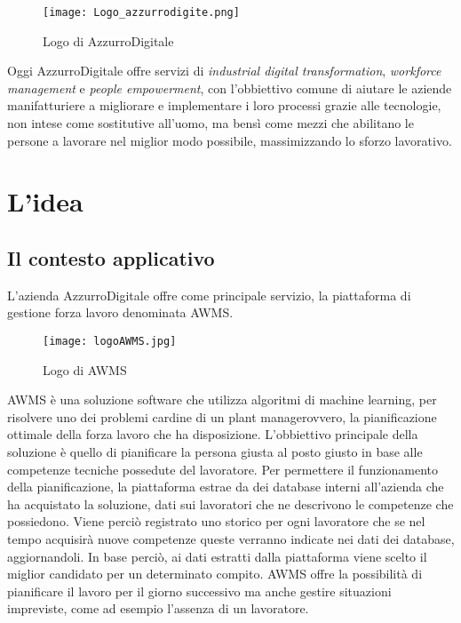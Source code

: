 \begin{figure}[h]
	\begin{center}
		\texttt{[image: Logo\_azzurrodigite.png]}
			\caption{Logo di AzzurroDigitale}
	\end{center}
\end{figure}
\pagebreak

Oggi AzzurroDigitale offre servizi di \emph{industrial digital transformation}, \emph{workforce management} e \emph{people empowerment}, con l'obbiettivo comune di aiutare le aziende manifatturiere a migliorare e implementare i loro processi grazie alle tecnologie, non intese come sostitutive all’uomo, ma bensì come mezzi che abilitano le persone a lavorare nel miglior modo possibile, massimizzando lo sforzo lavorativo.\\

\section{L'idea}

\subsection{Il contesto applicativo}
L'azienda AzzurroDigitale offre come principale servizio, la piattaforma di gestione forza lavoro denominata \gls{AWMS}.\\
	\begin{figure}[!h] 
		\begin{center}
			\texttt{[image: logoAWMS.jpg]}
			\caption{Logo di AWMS}
		\end{center}
	\end{figure}

\gls{AWMS} è una soluzione software che utilizza algoritmi di \gls{machine learning}\glsfirstoccur, per risolvere uno dei problemi cardine di un \gls{plant manager}\glsfirstoccur ovvero, la pianificazione ottimale della forza lavoro che ha disposizione. L'obbiettivo principale della soluzione è quello di pianificare la persona giusta al posto giusto in base alle competenze tecniche possedute del lavoratore. Per permettere il funzionamento della pianificazione, la piattaforma estrae da dei database interni all'azienda che ha acquistato la soluzione, dati sui lavoratori che ne descrivono le competenze che possiedono. Viene perciò registrato uno storico per ogni lavoratore che se nel tempo acquisirà nuove competenze queste verranno indicate nei dati dei database, aggiornandoli. In base perciò, ai dati estratti dalla piattaforma viene scelto il miglior candidato per un determinato compito. \gls{AWMS} offre la possibilità di pianificare il lavoro per il giorno successivo ma anche gestire situazioni impreviste, come ad esempio l'assenza di un lavoratore.

